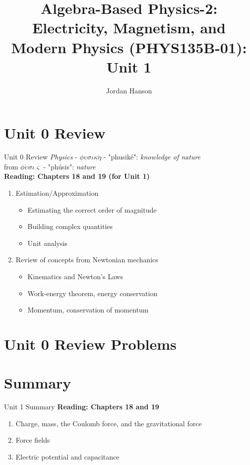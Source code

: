 \documentclass{beamer}
\title{Algebra-Based Physics-2: Electricity, Magnetism, and Modern Physics (PHYS135B-01): Unit 1}
\author{Jordan Hanson}
\institute{Whittier College Department of Physics and Astronomy}
\begin{document}
\maketitle

\section{Unit 0 Review}

\begin{frame}{Unit 0 Review}
\textit{Physics} - $\phi\upsilon\sigma\iota\kappa\acute{\eta}$ - "phusik\'e": \textit{knowledge of nature} \\
from $\phi\acute{\upsilon}\sigma\iota\varsigma$ - "ph\'usis": \textit{nature} \\
\textbf{Reading: Chapters 18 and 19 (for Unit 1)}
\begin{enumerate}
\item Estimation/Approximation
\begin{itemize}
\item \alert{Estimating} the correct order of magnitude
\item \alert{Building} complex quantities
\item \alert{Unit analysis}
\end{itemize}
\item Review of concepts from Newtonian mechanics
\begin{itemize}
\item Kinematics and \alert{Newton's Laws}
\item Work-energy theorem, energy conservation
\item Momentum, conservation of momentum
\end{itemize}
\end{enumerate}
\end{frame}

\section{Unit 0 Review Problems}

\section{Summary}

\begin{frame}{Unit 1 Summary}
\textbf{Reading: Chapters 18 and 19}
\begin{enumerate}
\item Charge, mass, the Coulomb force, and the gravitational force
\item Force fields
\item Electric potential and capacitance
\end{enumerate}
\end{frame}
\end{document}
